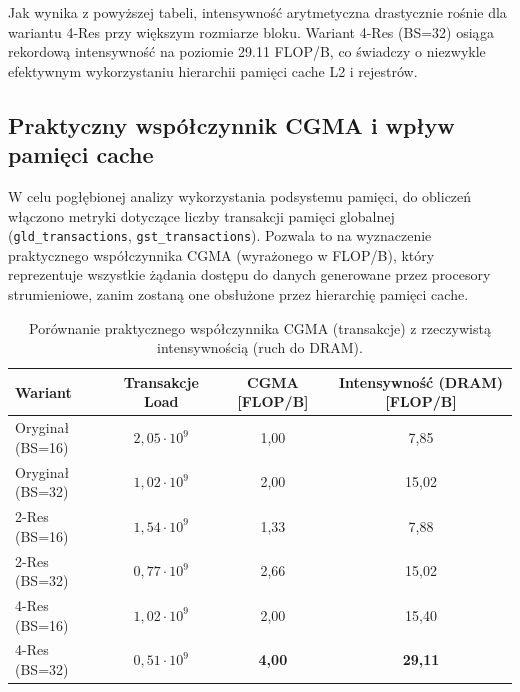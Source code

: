\documentclass[10pt]{article}
\begin{document}
Jak wynika z powyższej tabeli, intensywność arytmetyczna drastycznie rośnie dla wariantu 4-Res przy większym rozmiarze bloku. Wariant 4-Res (BS=32) osiąga rekordową intensywność na poziomie 29.11 FLOP/B, co świadczy o niezwykle efektywnym wykorzystaniu hierarchii pamięci cache L2 i rejestrów.

\subsection*{Praktyczny współczynnik CGMA i wpływ pamięci cache}
W celu pogłębionej analizy wykorzystania podsystemu pamięci, do obliczeń włączono metryki dotyczące liczby transakcji pamięci globalnej (\texttt{gld\_transactions}, \texttt{gst\_transactions}). Pozwala to na wyznaczenie praktycznego współczynnika CGMA (wyrażonego w FLOP/B), który reprezentuje wszystkie żądania dostępu do danych generowane przez procesory strumieniowe, zanim zostaną one obsłużone przez hierarchię pamięci cache.

\begin{table}[h!]
\centering
\begin{tabular}{|l|c|c|c|}
\hline
\textbf{Wariant} & \textbf{Transakcje Load} & \textbf{CGMA [FLOP/B]} & \textbf{Intensywność (DRAM) [FLOP/B]} \\
\hline
Oryginał (BS=16) & $2,05 \cdot 10^9$ & 1,00 & 7,85 \\
\hline
Oryginał (BS=32) & $1,02 \cdot 10^9$ & 2,00 & 15,02 \\
\hline
2-Res (BS=16) & $1,54 \cdot 10^9$ & 1,33 & 7,88 \\
\hline
2-Res (BS=32) & $0,77 \cdot 10^9$ & 2,66 & 15,02 \\
\hline
4-Res (BS=16) & $1,02 \cdot 10^9$ & 2,00 & 15,40 \\
\hline
4-Res (BS=32) & $0,51 \cdot 10^9$ & \textbf{4,00} & \textbf{29,11} \\
\hline
\end{tabular}
\caption{Porównanie praktycznego współczynnika CGMA (transakcje) z rzeczywistą intensywnością (ruch do DRAM).}
\end{table}
\end{document}
